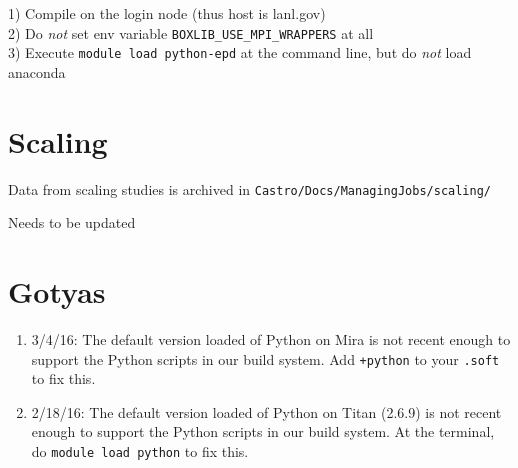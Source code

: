 1) Compile on the login node (thus host is lanl.gov)\\
2) Do \textit{not} set env variable \texttt{BOXLIB\_USE\_MPI\_WRAPPERS} at all\\
3) Execute \texttt{module load python-epd} at the command line, but do \textit{not} load anaconda\\


\section{Scaling}

Data from scaling studies is archived in {\tt Castro/Docs/ManagingJobs/scaling/}

Needs to be updated



\section{Gotyas}

\begin{enumerate}

\item 3/4/16: The default version loaded of Python on Mira is not
  recent enough to support the Python scripts in our build system. Add
  {\tt +python} to your {\tt .soft} to fix this.

\item 2/18/16: The default version loaded of Python on Titan (2.6.9)
  is not recent enough to support the Python scripts in our build
  system. At the terminal, do {\tt module load python} to fix this.


\end{enumerate}

